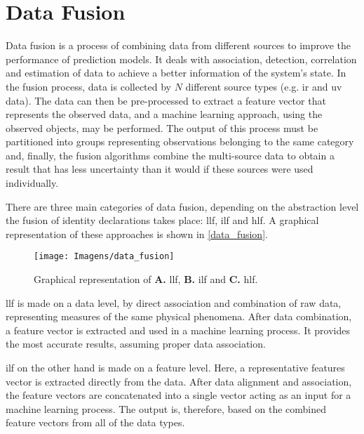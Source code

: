 
\section{Data Fusion}


Data fusion is a process of combining data from different sources to improve the performance of prediction models. It deals with association, detection, correlation and estimation of data to achieve a better information of the system's state. In the fusion process, data is collected by $ N $ different source types (e.g. \gls{ir} and \gls{uv} data). The data can then be pre-processed to extract a feature vector that represents the observed data, and a machine learning approach, using the observed objects, may be performed. The output of this process must be partitioned into groups representing observations belonging to the same category and, finally, the fusion algorithms combine the multi-source data to obtain a result that has less uncertainty than it would if these sources were used individually. 

There are three main categories of data fusion, depending on the abstraction level the fusion of identity declarations takes place: \gls{llf}, \gls{ilf} and \gls{hlf}. A graphical representation of these approaches is shown in \autoref{data_fusion}.


\begin{figure}[!htb]
	\centering
	\texttt{[image: Imagens/data\_fusion]}
	\caption{Graphical representation of \textbf{A.} \acrfull{llf}, \textbf{B.} \acrfull{ilf} and \textbf{C.} \acrfull{hlf}.}
	\label{data_fusion}
\end{figure}


\gls{llf} is made on a data level, by direct association and combination of raw data, representing measures of the same physical phenomena. After data combination, a feature vector is extracted and used in a machine learning process. It provides the most accurate results, assuming proper data association.

\gls{ilf} on the other hand is made on a feature level. Here, a representative features vector is extracted directly from the data. After data alignment and association, the feature vectors are concatenated into a single vector acting as an input for a machine learning process. The output is, therefore, based on the combined feature vectors from all of the data types.

